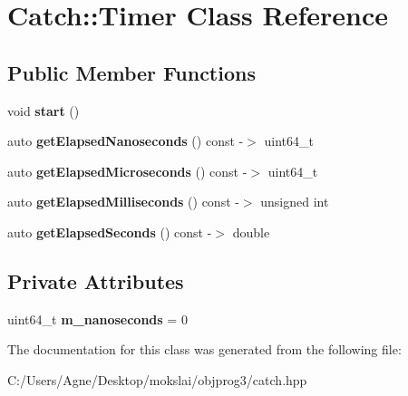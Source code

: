 \hypertarget{class_catch_1_1_timer}{}\section{Catch\+:\+:Timer Class Reference}
\label{class_catch_1_1_timer}
\subsection*{Public Member Functions}
\begin{DoxyCompactItemize}
\item 
\mbox{\label{class_catch_1_1_timer_a0a56e879e43f36c102bf9ea8b5fc8b72}} 
void {\bfseries start} ()
\item 
\mbox{\label{class_catch_1_1_timer_a57be5d17ca868a2d6fb1eea84de665cf}} 
auto {\bfseries get\+Elapsed\+Nanoseconds} () const -\/$>$ uint64\+\_\+t
\item 
\mbox{\label{class_catch_1_1_timer_a545de17a61a6fee1dbe3de5b0723e5fa}} 
auto {\bfseries get\+Elapsed\+Microseconds} () const -\/$>$ uint64\+\_\+t
\item 
\mbox{\label{class_catch_1_1_timer_a30aaf458dbb59dd8ac8971c9c62e0eac}} 
auto {\bfseries get\+Elapsed\+Milliseconds} () const -\/$>$ unsigned int
\item 
\mbox{\label{class_catch_1_1_timer_a065e37e3c9eb16bd4dcf41971d8deedc}} 
auto {\bfseries get\+Elapsed\+Seconds} () const -\/$>$ double
\end{DoxyCompactItemize}
\subsection*{Private Attributes}
\begin{DoxyCompactItemize}
\item 
\mbox{\label{class_catch_1_1_timer_ac13c1ef867cc3b9f942032d5ed79c2a7}} 
uint64\+\_\+t {\bfseries m\+\_\+nanoseconds} = 0
\end{DoxyCompactItemize}


The documentation for this class was generated from the following file\+:\begin{DoxyCompactItemize}
\item 
C\+:/\+Users/\+Agne/\+Desktop/mokslai/objprog3/catch.\+hpp\end{DoxyCompactItemize}
